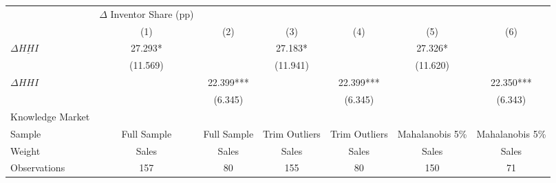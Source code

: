 {
\def\sym#1{\ifmmode^{#1}\else\(^{#1}\)\fi}
\begin{tabular}{l*{6}{c}}
\hline\hline
                    &$\Delta$ Inventor Share (pp)   &               &               &               &               &               \\
                    &\multicolumn{1}{c}{(1)}   &\multicolumn{1}{c}{(2)}   &\multicolumn{1}{c}{(3)}   &\multicolumn{1}{c}{(4)}   &\multicolumn{1}{c}{(5)}   &\multicolumn{1}{c}{(6)}   \\
\hline
$\Delta \underline{HHI}$   &      27.293*  &               &      27.183*  &               &      27.326*  &               \\
                    &    (11.569)   &               &    (11.941)   &               &    (11.620)   &               \\
$\Delta HHI$              &               &      22.399***&               &      22.399***&               &      22.350***\\
                    &               &     (6.345)   &               &     (6.345)   &               &     (6.343)   \\
\hline
Knowledge Market &               &               &               &               &               &               \\
Sample              & Full Sample   & Full Sample   &Trim Outliers   &Trim Outliers   &Mahalanobis 5\%   &Mahalanobis 5\%   \\
Weight              &       Sales   &       Sales   &       Sales   &       Sales   &       Sales   &       Sales   \\
Observations        &         157   &          80   &         155   &          80   &         150   &          71   \\
\hline\hline
\end{tabular}
}

